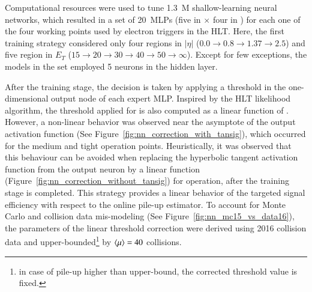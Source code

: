 Computational resources were used to tune 1.3~M shallow-learning neural networks, which resulted in a set of \SI{20}{MLPs} (five in \et{} $\times$ four in \abseta{}) for each one of the four working points used by electron triggers in the HLT. 
Here, the first training strategy considered only four regions in $|\eta|$ ($0.0\rightarrow 0.8\rightarrow1.37\rightarrow2.5$) and five region in $E_T$ ($15\rightarrow 20\rightarrow 30\rightarrow 40\rightarrow 50\rightarrow\infty$).
Except for few exceptions, the models in the set employed 5 neurons in the hidden layer. 

After the training stage, the decision is taken by applying a threshold in the one-dimensional output node of each expert MLP. 
Inspired by the HLT likelihood algorithm, the threshold applied for \rnn is also computed as a linear function of \avgmu{}.
However, a non-linear behavior was observed near the asymptote of the output activation function (See Figure~\ref{fig:nn_correction_with_tansig}), which occurred for the medium and tight operation points. Heuristically, it was 
observed that this behaviour can be avoided when replacing the hyperbolic tangent activation function from the output neuron by a linear function (Figure~\ref{fig:nn_correction_without_tansig}) for operation, after the training stage is completed.
This strategy provides a linear behavior of the targeted signal efficiency with respect to the online pile-up estimator. 
To account for Monte Carlo and collision data mis-modeling (See Figure~\ref{fig:nn_mc15_vs_data16}), the parameters of the linear threshold correction were derived using 2016 collision data and upper-bounded\footnote{in case of pile-up higher than upper-bound, the corrected threshold value is fixed.} by $\langle \mu \rangle=40$ collisions. 


